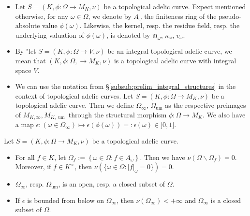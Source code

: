 \documentclass [11pt,reqno]{amsart}
\newcommand{\1}{\mathmybb{1}}
\def\m{\mathfrak m}
\def\um{\operatorname{um}}
\def\setminus{\smallsetminus}
\begin{document}
\begin{notation}
\begin{itemize}
	\item[(1)] Let $S=(K,\phi:\Omega\to M_K,\nu)$ be a topological adelic curve. Expect mentioned otherwise, for any $\omega\in \Omega$, we denote by $A_{\omega}$ the finiteness ring of the pseudo-absolute value $\phi(\omega)$. Likewise, the kernel, resp. the residue field, resp. the underlying valuation of $\phi(\omega)$, is denoted by $\m_{\omega}$, $\kappa_{\omega}$, $v_{\omega}$.
	\item[(2)] By "let $S=(K,\phi:\Omega\to V,\nu)$ be an integral topological adelic curve, we mean that $(K,\phi:\Omega,\to M_K,\nu)$ is a topological adelic curve with integral space $V$. 
	\item[(3)] We can use the notation from \S \ref{subsub:prelim_integral_structures} in the context of topological adelic curves. Let $S=(K,\phi:\Omega\to M_K,\nu)$ be a topological adelic curve. Then we define $\Omega_{\infty}$, $\Omega_{\um}$ as the respective preimages of $M_{K,\infty},M_{K,\um}$ through the structural morphism $\phi : \Omega \to M_K$. We also have a map $\epsilon : (\omega\in\Omega_{\infty}) \mapsto \epsilon(\phi(\omega))=:\epsilon(\omega)\in ]0,1]$.
\end{itemize}
\end{notation}


\begin{proposition}
\label{prop:properties_topological_adelic_curves}
Let $S=(K,\phi:\Omega\to M_K,\nu)$ be a topological adelic curve. 
\begin{itemize}
	\item[(i)] For all $f\in K$, let $\Omega_f := \left\{\omega\in\Omega : f\in A_{\omega} \right\}$. Then we have $\nu(\Omega\setminus \Omega_f)=0$. Moreover, if $f\in K^{\times}$, then $\nu\left(\{\omega\in\Omega : |f|_{\omega} = 0\}\right) = 0$.
	\item[(ii)] $\Omega_{\infty}$, resp. $\Omega_{\um}$, is an open, resp. a closed subset of $\Omega$. 
	\item[(iii)] If $\epsilon$ is bounded from below on $\Omega_{\infty}$, then $\nu(\Omega_{\infty}) < +\infty$ and $\Omega_{\infty}$ is a closed subset of $\Omega$. 
	
\end{itemize}
\end{proposition}
\end{document}

